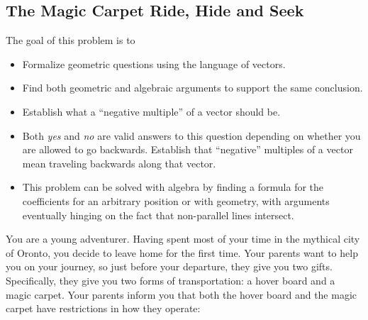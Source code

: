 \documentclass{workbook}
\begin{document}
\begin{iola}
\begin{slide}
\section*{The Magic Carpet Ride, Hide and Seek}
\question

\begin{annotation}
	\begin{goals}

		The goal of this problem is to
		\begin{itemize}
			\item Formalize geometric questions using the language of vectors.
			\item Find both geometric and algebraic arguments to support the same
				conclusion.
			\item Establish what a ``negative multiple'' of a vector should be.
		\end{itemize}
	\end{goals}
	\begin{notes}
		\begin{itemize}
			\item Both \emph{yes} and \emph{no} are valid answers to
				this question depending on whether you are allowed
				to go backwards. Establish that ``negative'' multiples of
				a vector mean traveling backwards along that vector.
			\item This problem can be solved with algebra by finding a formula
				for the coefficients for an arbitrary position or with geometry,
				with arguments eventually hinging on the fact that non-parallel
				lines intersect.
		\end{itemize}
	\end{notes}
\end{annotation}
You are a young adventurer. Having spent most of your time in the mythical city of Oronto,
	you decide to leave home for the first time. Your parents
want to help you on your journey, so just before your departure, they give
you two gifts. Specifically, they give you two forms of transportation:
a hover board and a magic carpet. Your parents inform you that both the
hover board and the magic carpet have restrictions in how they operate:




\end{slide}
\end{iola}
\end{document}
